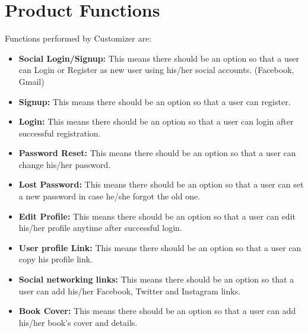 \section{Product Functions}

Functions performed by Customizer are:
\begin{itemize}
   
     \item \textbf{Social Login/Signup:} This means there should be an option so that a user can Login or Register as new user using his/her social accounts. (Facebook, Gmail)
     \item \textbf{Signup:} This means there should be an option so that a user can register.
     \item \textbf{Login:} This means there should be an option so that a user can login after successful registration.
     \item \textbf{Password Reset:} This means there should be an option so that a user can change his/her password.
     \item \textbf{Lost Password:} This means there should be an option so that a user can set a new password in case he/she forgot the old one.
     \item \textbf{Edit Profile:} This means there should be an option so that a user can edit his/her profile anytime after successful login.
     \item \textbf{User profile Link:} This means there should be an option so that a user can copy his profile link.
     \item \textbf{Social networking links:} This means there should be an option so that a user can add his/her Facebook, Twitter and Instagram links. 
     \item \textbf{Book Cover:} This means there should be an option so that a user can add his/her book’s cover and details.
     
\end{itemize}

